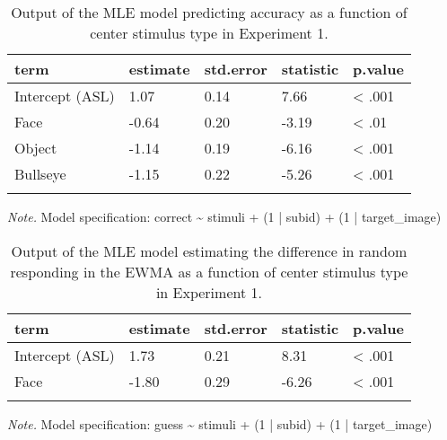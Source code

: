 \documentclass[,man,floatsintext]{apa6}
\begin{document}
\begin{appendix}
\begin{table}[h]
\begin{center}
\begin{threeparttable}
\caption{\label{tab:mle acc trio}Output of the MLE model predicting accuracy as a function of center stimulus type in Experiment 1.}
\begin{tabular}{lllll}
\toprule
term & \multicolumn{1}{c}{estimate} & \multicolumn{1}{c}{std.error} & \multicolumn{1}{c}{statistic} & \multicolumn{1}{c}{p.value}\\
\midrule
Intercept (ASL) & 1.07 & 0.14 & 7.66 & < .001\\
Face & -0.64 & 0.20 & -3.19 & < .01\\
Object & -1.14 & 0.19 & -6.16 & < .001\\
Bullseye & -1.15 & 0.22 & -5.26 & < .001\\
\bottomrule
\addlinespace
\end{tabular}
\begin{tablenotes}[para]
\normalsize{\textit{Note.} Model specification: correct \textasciitilde{} stimuli + (1 | subid) + (1 | target\_image)}
\end{tablenotes}
\end{threeparttable}
\end{center}
\end{table}

\begin{table}[h]
\begin{center}
\begin{threeparttable}
\caption{\label{tab:mle ewma trio prop lang}Output of the MLE model estimating the difference in random responding in the EWMA as a function of center stimulus type in Experiment 1.}
\begin{tabular}{lllll}
\toprule
term & \multicolumn{1}{c}{estimate} & \multicolumn{1}{c}{std.error} & \multicolumn{1}{c}{statistic} & \multicolumn{1}{c}{p.value}\\
\midrule
Intercept (ASL) & 1.73 & 0.21 & 8.31 & < .001\\
Face & -1.80 & 0.29 & -6.26 & < .001\\
\bottomrule
\addlinespace
\end{tabular}
\begin{tablenotes}[para]
\normalsize{\textit{Note.} Model specification: guess \textasciitilde{} stimuli + (1 | subid) + (1 | target\_image)}
\end{tablenotes}
\end{threeparttable}
\end{center}
\end{table}


\end{appendix}
\end{document}
